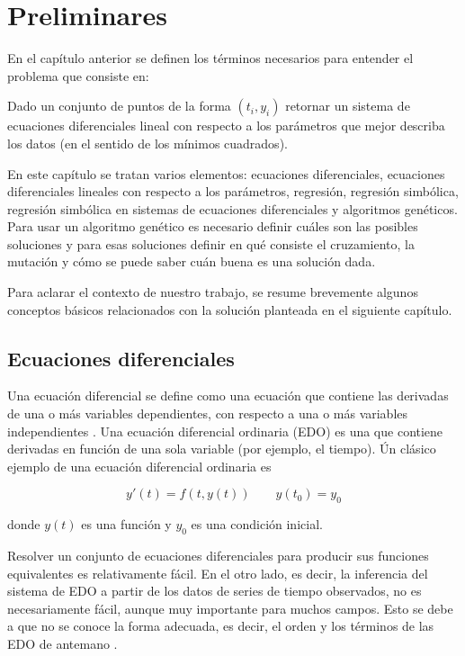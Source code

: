 \chapter{Preliminares}\label{chapter:preliminaries}

En el capítulo anterior se definen los términos necesarios para entender el problema que consiste en:

Dado un conjunto de puntos de la forma $(t_i, y_i)$ retornar un sistema de ecuaciones diferenciales lineal con respecto a los parámetros que mejor describa los datos (en el sentido de los mínimos cuadrados).

En este capítulo se tratan varios elementos: ecuaciones diferenciales, ecuaciones diferenciales lineales con respecto a los parámetros, regresión, regresión simbólica, regresión simbólica en sistemas de ecuaciones diferenciales y algoritmos genéticos. Para usar un algoritmo genético es necesario definir cuáles son las posibles soluciones y para esas soluciones definir en qué consiste el cruzamiento, la mutación y cómo se puede saber cuán buena es una solución dada.

Para aclarar el contexto de nuestro trabajo, se resume brevemente algunos conceptos básicos relacionados con la solución planteada en el siguiente capítulo.

\section{Ecuaciones diferenciales}

Una ecuación diferencial se define como una ecuación que contiene las derivadas de una o más variables dependientes, con respecto a una o más variables independientes \cite{gaucel2014learning}. Una ecuación diferencial ordinaria (EDO) es una que contiene derivadas en función de una sola variable (por ejemplo, el tiempo). Ún clásico ejemplo de una ecuación diferencial ordinaria es

$$y'(t)=f(t, y(t)) \qquad y(t_0) = y_0$$

donde $y(t)$ es una función y $y_0$ es una condición inicial.

Resolver un conjunto de ecuaciones diferenciales para producir sus funciones equivalentes es relativamente fácil. En el otro lado, es decir, la inferencia del sistema de EDO a partir de los datos de series de tiempo observados, no es necesariamente fácil, aunque muy importante para muchos campos. Esto se debe a que no se conoce la forma adecuada, es decir, el orden y los términos de las EDO de antemano \cite{iba2008inference}.


